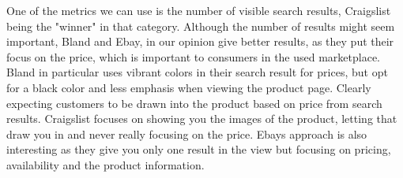 One of the metrics we can use is the number of visible search results, Craigslist being the "winner" in that category. Although the number of results might seem important, Bland and Ebay, in our opinion give better results, as they put their focus on the price, which is important to consumers in the used marketplace. Bland in particular uses vibrant colors in their search result for prices, but opt for a black color and less emphasis when viewing the product page. Clearly expecting customers to be drawn into the product based on price from search results. Craigslist focuses on showing you the images of the product, letting that draw you in and never really focusing on the price. Ebays approach is also interesting as they give you only one result in the view but focusing on pricing, availability and the product information. 